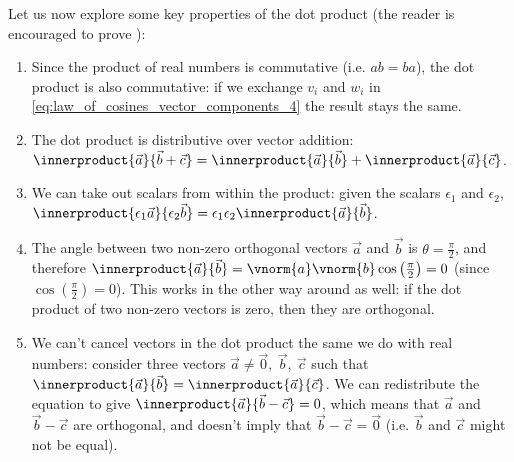 Let us now explore some key properties of the dot product (the reader is encouraged to prove ):
\begin{enumerate}
	\item Since the product of real numbers is commutative (i.e. $ab=ba$), the dot product is also commutative: if we exchange $v_{i}$ and $w_{i}$ in \autoref{eq:law_of_cosines_vector_components_4} the result stays the same.
	\item\label{item:dpdistributive} The dot product is distributive over vector addition: $\innerproduct{\vec{a}}{\vec{b}+\vec{c}} = \innerproduct{\vec{a}}{\vec{b}} + \innerproduct{\vec{a}}{\vec{c}}$.
	\item\label{item:dpscalars} We can take out scalars from within the product: given the scalars $\epsilon_{1}$ and $\epsilon_{2}$, $\innerproduct{\epsilon_{1}\vec{a}}{\epsilon_{2}\vec{b}} = \epsilon_{1}\epsilon_{2}\innerproduct{\vec{a}}{\vec{b}}$.
	\item The angle between two non-zero orthogonal vectors $\vec{a}$ and $\vec{b}$ is $\theta=\frac{\pi}{2}$, and therefore $\innerproduct{\vec{a}}{\vec{b}} = \vnorm{a}\vnorm{b}\cos\left(\frac{\pi}{2}\right) = 0$ (since $\cos\left(\frac{\pi}{2}\right)=0$). This works in the other way around as well: if the dot product of two non-zero vectors is zero, then they are orthogonal.
	\item We can't cancel vectors in the dot product the same we do with real numbers: consider three vectors $\vec{a}\neq\vec{0},\ \vec{b},\ \vec{c}$ such that $\innerproduct{\vec{a}}{\vec{b}}=\innerproduct{\vec{a}}{\vec{c}}$. We can redistribute the equation to give $\innerproduct{\vec{a}}{\vec{b}-\vec{c}}=0$, which means that $\vec{a}$ and $\vec{b}-\vec{c}$ are orthogonal, and doesn't imply that $\vec{b}-\vec{c}=\vec{0}$ (i.e. $\vec{b}$ and $\vec{c}$ might not be equal).
\end{enumerate}

